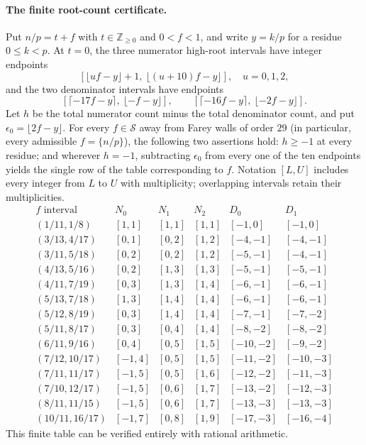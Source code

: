 \documentclass[11pt]{article}
\begin{document}
\paragraph{The finite root-count certificate.}
Put $n/p=t+f$ with $t\in\mathbb Z_{\ge0}$ and $0<f<1$, and write
$y=k/p$ for a residue $0\le k<p$.  At $t=0$, the three numerator high-root
intervals have integer endpoints
\[
 [\lfloor uf-y\rfloor+1,\ \lfloor(u+10)f-y\rfloor],\quad u=0,1,2,
\]
and the two denominator intervals have endpoints
\[
 [\lceil-17f-y\rceil,\ \lfloor-f-y\rfloor],\qquad
 [\lceil-16f-y\rceil,\ \lfloor-2f-y\rfloor].
\]
Let $h$ be the total numerator count minus the total denominator count,
and put $\epsilon_0=\lfloor2f-y\rfloor$.
For every $f\in\mathcal S$ away from Farey walls of order $29$ (in particular, every admissible $f=\{n/p\}$), the following two assertions hold:
$h\ge-1$ at every residue; and wherever $h=-1$, subtracting $\epsilon_0$
from every one of the ten endpoints yields the single row of the table
corresponding to $f$.  Notation $[L,U]$ includes every integer from $L$ to
$U$ with multiplicity; overlapping intervals retain their multiplicities.
\[
\begin{array}{c|ccc|cc}
 f\text{ interval}&N_0&N_1&N_2&D_0&D_1\\\hline
 (1/11,1/8)&[1,1]&[1,1]&[1,1]&[-1,0]&[-1,0]\\
 (3/13,4/17)&[0,1]&[0,2]&[1,2]&[-4,-1]&[-4,-1]\\
 (3/11,5/18)&[0,2]&[0,2]&[1,2]&[-5,-1]&[-4,-1]\\
 (4/13,5/16)&[0,2]&[1,3]&[1,3]&[-5,-1]&[-5,-1]\\
 (4/11,7/19)&[0,3]&[1,3]&[1,4]&[-6,-1]&[-6,-1]\\
 (5/13,7/18)&[1,3]&[1,4]&[1,4]&[-6,-1]&[-6,-1]\\
 (5/12,8/19)&[0,3]&[1,4]&[1,4]&[-7,-1]&[-7,-2]\\
 (5/11,8/17)&[0,3]&[0,4]&[1,4]&[-8,-2]&[-8,-2]\\
 (6/11,9/16)&[0,4]&[0,5]&[1,5]&[-10,-2]&[-9,-2]\\
 (7/12,10/17)&[-1,4]&[0,5]&[1,5]&[-11,-2]&[-10,-3]\\
 (7/11,11/17)&[-1,5]&[0,5]&[1,6]&[-12,-2]&[-11,-3]\\
 (7/10,12/17)&[-1,5]&[0,6]&[1,7]&[-13,-2]&[-12,-3]\\
 (8/11,11/15)&[-1,5]&[0,6]&[1,7]&[-13,-3]&[-13,-3]\\
 (10/11,16/17)&[-1,7]&[0,8]&[1,9]&[-17,-3]&[-16,-4]
\end{array}
\]
This finite table can be verified entirely with rational arithmetic.
\end{document}
